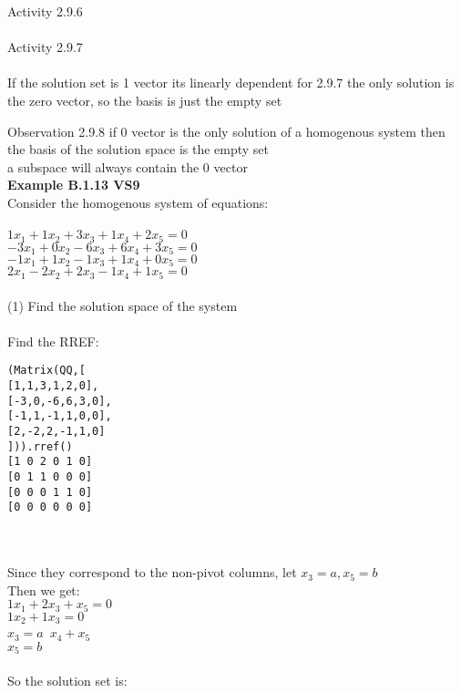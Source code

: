 \documentclass{article}
\begin{document}
Activity 2.9.6\\
\\
Activity 2.9.7\\
\\
If the solution set is 1 vector its linearly dependent
for 2.9.7 the only solution is the zero vector, so the basis is just the empty set {}

Observation 2.9.8 if 0 vector is the only solution of a homogenous system then the basis of the solution space is the empty set\\
a subspace will always contain the 0 vector \\

\textbf{Example B.1.13 VS9}\\
Consider the homogenous system of equations:\\
\\
$1x_{1} + 1x_{2} + 3x_{3} + 1x_{4} + 2x_{5} = 0$\\
$-3x_{1} + 0x_{2} - 6x_{3} + 6x_{4} + 3x_{5} = 0$\\
$-1x_{1} + 1x_{2} - 1x_{3} + 1x_{4} + 0x_{5} = 0$\\
$2x_{1} - 2x_{2} + 2x_{3} - 1x_{4} + 1x_{5} = 0$\\
\\
(1) Find the solution space of the system\\
\\
Find the RREF:
\begin{verbatim}
(Matrix(QQ,[
[1,1,3,1,2,0],
[-3,0,-6,6,3,0],
[-1,1,-1,1,0,0],
[2,-2,2,-1,1,0]
])).rref()
[1 0 2 0 1 0]
[0 1 1 0 0 0]
[0 0 0 1 1 0]
[0 0 0 0 0 0]
\end{verbatim}\\
\\
Since they correspond to the non-pivot columns, let $x_{3} = a, x_{5} = b$\\
Then we get:\\
$1x_{1} + 2x_{3} + x_{5} = 0$\\
$1x_{2} + 1x_{3} = 0$\\
$x_{3} = a$\
$x_{4} + x_{5}$\\
$x_{5} = b$\\
\\
So the solution set is:\\
\\
\end{document}
